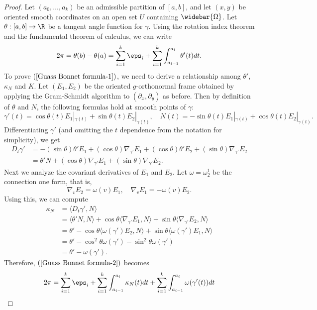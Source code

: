 \begin{proof}
Let $(a_0,\dots,a_k)$ be an admissible partition of $[a,b]$, and let $(x,y)$ be oriented smooth coordinates on an open set $U$ containing $\widebar{\Omega}$. Let $\theta:[a,b]\to\R$ 
be a tangent angle function for $\gamma$. Using the rotation index theorem and the fundamental theorem of calculus, we can write
\begin{align}\label{Guass Bonnet formula-2}
2\pi=\theta(b)-\theta(a)=\sum_{i=1}^{k}\eps_i+\sum_{i=1}^{k}\int_{a_{i-1}}^{a_i}\theta'(t)dt.
\end{align}
To prove $(\ref{Guass Bonnet formula-1})$, we need to derive a relationship among $\theta'$, $\kappa_N$ and $K$. Let $(E_1,E_2)$ be the oriented $g$-orthonormal frame 
obtained by applying the Gram-Schmidt algorithm to $(\partial_x,\partial_y)$ as before. Then by definition of $\theta$ and $N$, the following formulas hold at smooth 
points of $\gamma$:
\[\gamma'(t)=\cos\theta(t)E_1|_{\gamma(t)}+\sin\theta(t)E_2|_{\gamma(t)},\quad N(t)=-\sin\theta(t)E_1|_{\gamma(t)}+\cos\theta(t)E_2|_{\gamma(t)}.\]
Differentiating $\gamma'$ (and omitting the $t$ dependence from the notation for simplicity), we get
\begin{align*}
D_t\gamma'&=-(\sin\theta)\theta'E_1+(\cos\theta)\nabla_{\gamma'}E_1+(\cos\theta)\theta'E_2+(\sin\theta)\nabla_{\gamma'}E_2\\
&=\theta'N+(\cos\theta)\nabla_{\gamma'}E_1+(\sin\theta)\nabla_{\gamma'}E_2.
\end{align*}
Next we analyze the covariant derivatives of $E_1$ and $E_2$. Let $\omega=\omega_2^1$ be the connection one form, that is, 
\[\nabla_vE_2=\omega(v)E_1,\quad\nabla_vE_1=-\omega(v)E_2.\] 
Using this, we can compute
\begin{align*}
\kappa_N&=\langle D_t\gamma',N\rangle\\
&=\langle\theta'N,N\rangle+\cos\theta\langle\nabla_{\gamma'}E_1,N\rangle+\sin\theta\langle\nabla_{\gamma'}E_2,N\rangle\\
&=\theta'-\cos\theta\langle\omega(\gamma')E_2,N\rangle+\sin\theta\langle\omega(\gamma')E_1,N\rangle\\
&=\theta'-\cos^2\theta\omega(\gamma')-\sin^2\theta\omega(\gamma')\\
&=\theta'-\omega(\gamma').
\end{align*}
Therefore, $(\ref{Guass Bonnet formula-2})$ becomes
\begin{align*}
2\pi&=\sum_{i=1}^{k}\eps_i+\sum_{i=1}^{k}\int_{a_{i-1}}^{a_i}\kappa_N(t)dt+\sum_{i=1}^{k}\int_{a_{i-1}}^{a_i}\omega(\gamma'(t))dt\\

\end{align*}
\end{proof}
